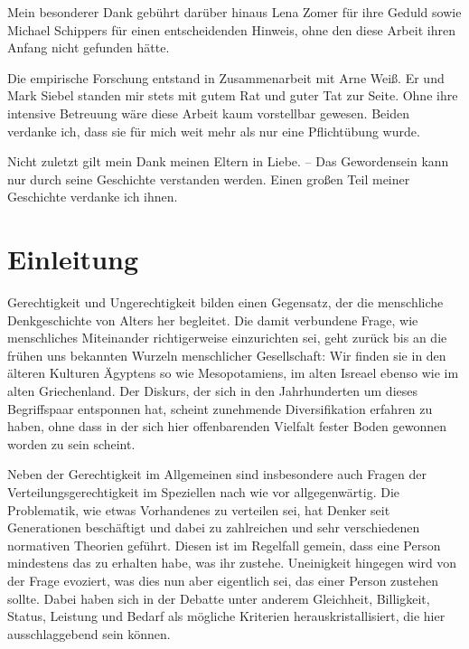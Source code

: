 \documentclass[a4paper]{thesis}
\begin{document}
{Mein besonderer Dank gebührt darüber hinaus Lena Zomer für ihre Geduld sowie Michael Schippers für einen entscheidenden Hinweis, ohne den diese Arbeit ihren Anfang nicht gefunden hätte.

Die empirische Forschung entstand in Zusammenarbeit mit Arne Weiß. Er und Mark Siebel standen mir stets mit gutem Rat und guter Tat zur Seite. Ohne ihre intensive Betreuung wäre diese Arbeit kaum vorstellbar gewesen. Beiden verdanke ich, dass sie für mich weit mehr als nur eine Pflichtübung wurde.

Nicht zuletzt gilt mein Dank meinen Eltern in Liebe. -- Das Gewordensein kann nur durch seine Geschichte verstanden werden. Einen großen Teil meiner Geschichte verdanke ich ihnen.}

\Inhaltsverzeichnis

\cleardoublepage
\section{Einleitung}
\lettrine{G}{}\thickspace erechtigkeit und Ungerechtigkeit bilden einen Gegensatz, der die menschliche Denkgeschichte von Alters her begleitet. Die damit verbundene Frage, wie menschliches Miteinander richtigerweise einzurichten sei, geht zurück bis an die frühen uns bekannten Wurzeln menschlicher Gesellschaft: Wir finden sie in den älteren Kulturen Ägyptens so wie Mesopotamiens, im alten Isreael ebenso wie im alten Griechenland. Der Diskurs, der sich in den Jahrhunderten um dieses Begriffspaar entsponnen hat, scheint zunehmende Diversifikation erfahren zu haben, ohne dass in der sich hier offenbarenden Vielfalt fester Boden gewonnen worden zu sein scheint.

Neben der Gerechtigkeit im Allgemeinen sind insbesondere auch Fragen der Verteilungsgerechtigkeit im Speziellen nach wie vor allgegenwärtig. Die Problematik, wie etwas Vorhandenes zu verteilen sei, hat Denker seit Generationen beschäftigt und dabei zu zahlreichen und sehr verschiedenen normativen Theorien geführt. Diesen ist im Regelfall gemein, dass eine Person mindestens das zu erhalten habe, was ihr zustehe. Uneinigkeit hingegen wird von der Frage evoziert, was dies nun aber eigentlich sei, das einer Person zustehen sollte. Dabei haben sich in der Debatte unter anderem Gleichheit, Billigkeit, Status, Leistung und Bedarf als mögliche Kriterien herauskristallisiert, die hier ausschlaggebend sein können.
\end{document}
